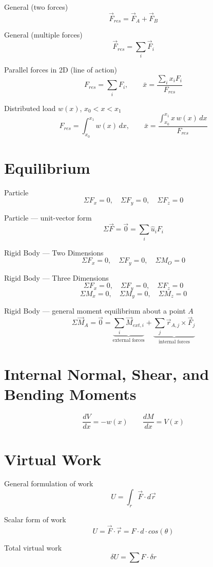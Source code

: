 \documentclass[11pt, titlepage]{article} %
\begin{document}
General (two forces)
\[
\vec{F}_{res} = \vec{F}_A + \vec{F}_B
\]

General (multiple forces)
\[
\vec{F}_{res} = \sum_i \vec{F}_i
\]

Parallel forces in 2D (line of action)
\[
F_{res} = \sum_i F_i, \qquad \bar{x} = \frac{\sum_i x_i F_i}{F_{res}}
\]

Distributed load $w(x)$, $x_0 < x < x_1$
\[
F_{res} = \int_{x_0}^{x_1} w(x)\,dx, \qquad \bar{x} = \frac{\int_{x_0}^{x_1} x\,w(x)\,dx}{F_{res}}
\]

\section{Equilibrium}

Particle
\[
\Sigma F_x = 0, \quad \Sigma F_y = 0, \quad \Sigma F_z = 0
\]

Particle --- unit-vector form
\[
\Sigma \vec{F} = \vec{0} = \sum_i \hat{u}_i F_i
\]

Rigid Body --- Two Dimensions
\[
\Sigma F_x = 0, \quad \Sigma F_y = 0, \quad \Sigma M_O = 0
\]

Rigid Body --- Three Dimensions
\[
\Sigma F_x = 0, \quad \Sigma F_y = 0, \quad \Sigma F_z = 0
\]
\[
\Sigma M_x = 0, \quad \Sigma M_y = 0, \quad \Sigma M_z = 0
\]

Rigid Body --- general moment equilibrium about a point $A$
\[
\Sigma \vec{M}_A = \vec{0} = \underbrace{\sum_i \vec{M}_{ext,i}}_{\text{external forces}} + \underbrace{\sum_j \vec{r}_{A,j} \times \vec{F}_j}_{\text{internal forces}}
\]

\section{Internal Normal, Shear, and Bending Moments}
\[\frac{dV}{dx} = -w(x) \qquad \frac{dM}{dx} = V(x)\]

\section{Virtual Work}
General formulation of work
\[U = \int_r \vec{F} \cdot d\vec{r}\]

Scalar form of work
\[U = \vec{F} \cdot \vec{r} = F \cdot d \cdot cos(\theta)\]

Total virtual work
\[\delta U = \sum F \cdot \delta r\]
\end{document}
